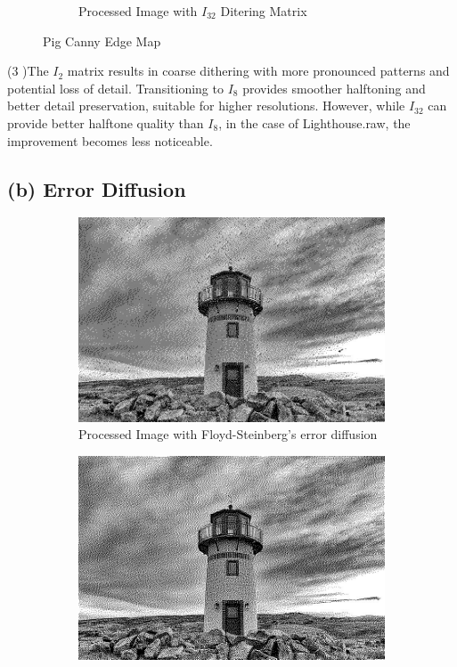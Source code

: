\documentclass[12pt]{article}
\begin{document}
\begin{figure}[H]
\begin{subfigure}{0.32\textwidth}
		\caption{Processed Image with $I_32$ Ditering Matrix}
		\label{fig:LighthouseI_32}
	\end{subfigure}
	\caption{Pig Canny Edge Map}
	\label{p2a2}
\end{figure}
(3 )The $I_2$ matrix results in coarse dithering with more pronounced patterns and potential loss of detail. Transitioning to $I_8$ provides smoother halftoning and better detail preservation, suitable for higher resolutions. However, while $I_32$ can provide better halftone quality than $I_8$,  in the case of Lighthouse.raw, the improvement becomes less noticeable.

\subsection*{(b) Error Diffusion}
\begin{figure}[H]
	\centering  %
	\begin{subfigure}{0.4\textwidth}
		\centering
		\includegraphics[width=\textwidth]{Lighthouse_floyd.jpg}
		\caption{Processed Image with Floyd-Steinberg’s error diffusion}
		\label{fig:Lighthouse_floyd}
	\end{subfigure}
	\hfill
	\begin{subfigure}{0.4\textwidth}
		\centering
		\includegraphics[width=\textwidth]{Lighthouse_JIN.jpg}

\end{subfigure}
\end{figure}
\end{document}
